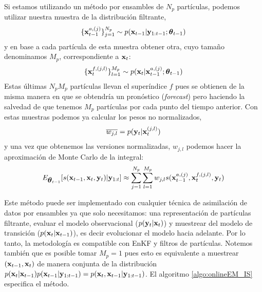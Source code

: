 Si estamos utilizando un método por ensambles de $N_p$ partículas, podemos utilizar nuestra muestra de la distribución filtrante,
\begin{align*}
    \{ \mathbf{x}_{t-1}^{a, (j)}\}_{j=1}^{N_p} \sim p(\mathbf{x}_{t-1} | \mathbf{y}_{1:t-1} ; \mbox{\boldmath$ \theta $}_{t-1})
\end{align*}
y en base a cada partícula de esta muestra obtener otra, cuyo tamaño denominamos $M_p$, correspondiente a $\mathbf{x}_t$:
\begin{align*}
    \{ \mathbf{x}_{t}^{f, (j,l)}\}_{l=1}^{M_p} \sim p(\mathbf{x}_t | \mathbf{x}_{t-1}^{a, (j)} ; \mbox{\boldmath$ \theta $}_{t-1})
\end{align*}
Estas últimas $N_p M_p$ partículas llevan el superíndice $f$ pues se obtienen de la misma manera en que se obtendría un pronóstico (\textit{forecast}) pero haciendo la salvedad de que tenemos $M_p$ partículas por cada punto del tiempo anterior. Con estas muestras podemos ya calcular los pesos no normalizados,
\begin{align*}
    \overline{w_{j,l}} = p(\mathbf{y}_t | \mathbf{x}_t^{(j,l)})
\end{align*}
y una vez que obtenemos las versiones normalizadas, $w_{j,l}$ podemos hacer la aproximación de Monte Carlo de la integral:
\begin{align*}
    E_{\mbox{\boldmath$ \theta $}_{t-1}} [s(\mathbf{x}_{t-1}, \mathbf{x}_t, \mathbf{y}_t) | \mathbf{y}_{1:t}] \approx \sum_{j=1}^{N_p} \sum_{l=1}^{M_p} w_{j, l} s(\mathbf{x}_{t-1}^{a, (j)}, \mathbf{x}_{t}^{f, (j,l)}, \mathbf{y}_t)
\end{align*}

Este método puede ser implementado con cualquier técnica de asimilación de datos por ensambles ya que solo necesitamos: una representación de partículas filtrante, evaluar el modelo observacional ($p(\mathbf{y}_t | \mathbf{x}_t)$) y muestrear del modelo de transición ($p(\mathbf{x}_t | \mathbf{x}_{t-1})$), es decir evolucionar el modelo hacia adelante. Por lo tanto, la metodología es compatible con EnKF y filtros de partículas. Notemos también que  es posible tomar $M_p = 1$ pues esto es equivalente a muestrear $(\mathbf{x}_{t-1}, \mathbf{x}_t)$ de manera conjunta de la distribución $p(\mathbf{x}_t | \mathbf{x}_{t-1}) p(\mathbf{x}_{t-1} | \mathbf{y}_{1:t-1}) = p(\mathbf{x}_t, \mathbf{x}_{t-1} | \mathbf{y}_{1:t-1})$. El algoritmo \ref{algo:onlineEM_IS} especifica el método.

